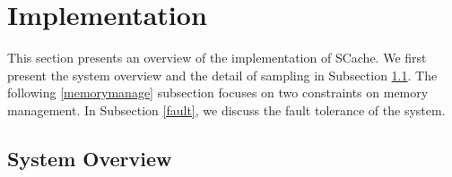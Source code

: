 \section{Implementation}\label{impl}
This section presents an overview of the implementation of SCache. 
We first present the system overview and the detail of sampling in Subsection \ref{arch}. 
The following \ref{memorymanage} subsection focuses on two constraints on memory management.
{\color{blue}
In Subsection \ref{fault}, we discuss the fault tolerance of the system.
}


\subsection{System Overview}\label{arch}
